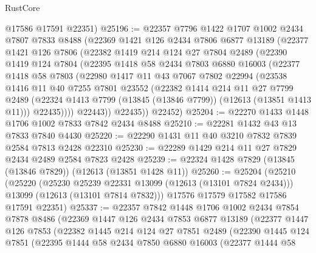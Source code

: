 \begin{lexlean}{RustCore}
\begin{coremodule}
      @17586
      @17591
      @22351)
@25196 := @22357
    @7796
    @1422
    @1707
    @1002
    @2434
    @7807
    @7833
    @8488
    (@22369
      @1421
      @126
      @2434
      @7806
      @6877
      @13189
      (@22377
        @1421
        @126
        @7806
        (@22382
          @1419
          @214
          @124
          @27
          @7804
          @2489
          (@22390
            @1419
            @124
            @7804
            (@22395
              @1418
              @58
              @2434
              @7803
              @6880
              @16003
              (@22377
                @1418
                @58
                @7803
                (@22980
                  @1417
                  @11
                  @43
                  @7067
                  @7802
                  @22994
                  (@23538
                    @1416
                    @11
                    @40
                    @7255
                    @7801
                    @23552
                    (@22382
                      @1414
                      @214
                      @11
                      @27
                      @7799
                      @2489
                      (@22324 @1413 @7799 (@13845 (@13846 @7799)) (@12613 (@13851 @1413 @11)))
                      @22435))))
              @22443))
          @22435))
      @22452)
@25204 := @22270 @1433 @1448 @1706 @1002 @7833 @7842 @2434 @8488
@25210 := @22281 @1432 @43 @13 @7833 @7840 @4430
@25220 := @22290 @1431 @11 @40 @3210 @7832 @7839 @2584 @7813 @2428 @22310
@25230 := @22289 @1429 @214 @11 @27 @7829 @2434 @2489 @2584 @7823 @2428
@25239 := @22324 @1428 @7829 (@13845 (@13846 @7829)) (@12613 (@13851 @1428 @11))
@25260 := @25204
    (@25210
      (@25220
        (@25230 @25239 @22331 @13099 (@12613 (@13101 @7824 @2434)))
        @13099
        (@12613 (@13101 @7814 @7832)))
      @17576
      @17579
      @17582
      @17586
      @17591
      @22351)
@25337 := @22357
    @7842
    @1448
    @1706
    @1002
    @2434
    @7854
    @7878
    @8486
    (@22369
      @1447
      @126
      @2434
      @7853
      @6877
      @13189
      (@22377
        @1447
        @126
        @7853
        (@22382
          @1445
          @214
          @124
          @27
          @7851
          @2489
          (@22390
            @1445
            @124
            @7851
            (@22395
              @1444
              @58
              @2434
              @7850
              @6880
              @16003
              (@22377
                @1444
                @58

\end{coremodule}
\end{lexlean}
